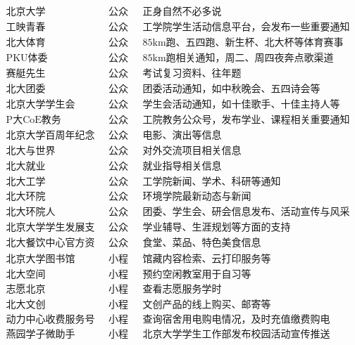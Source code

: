 \documentclass[11pt,oneside]{book}
\begin{document}
\[
\begin{matrix}
	\text{北京大学} & \text{公众号} & \text{正身自然不必多说}\\
	\text{工映青春} & \text{公众号} & \text{工学院学生活动信息平台，会发布一些重要通知}\\
	\text{北大体育} & \text{公众号} & \text{85km跑、五四跑、新生杯、北大杯等体育赛事通知}\\
	\text{PKU体委} & \text{公众号} & \text{85km跑相关通知，周二、周四夜奔点歌渠道}\\
	\text{赛艇先生} & \text{公众号} & \text{考试复习资料、往年题}\\
	\text{北大团委} & \text{公众号} & \text{团委活动通知，如中秋晚会、五四诗会等}\\
	\text{北京大学学生会} & \text{公众号} & \text{学生会活动通知，如十佳歌手、十佳主持人等}\\
	\text{P大CoE教务} & \text{公众号} & \text{工院教务公众号，发布学业、课程相关重要通知}\\
	\text{北京大学百周年纪念讲堂} & \text{公众号} & \text{电影、演出等信息}\\
	\text{北大与世界} & \text{公众号} & \text{对外交流项目相关信息}\\
	\text{北大就业} & \text{公众号} & \text{就业指导相关信息}\\
	\text{北大工学} & \text{公众号} & \text{工学院新闻、学术、科研等通知}\\
	\text{北大环院} & \text{公众号} & \text{环境学院最新动态与新闻}\\
	\text{北大环院人} & \text{公众号} & \text{团委、学生会、研会信息发布、活动宣传与风采展示平台}\\
	\text{北京大学学生发展支持} & \text{公众号} & \text{学业辅导、生涯规划等方面的支持}\\
	\text{北大餐饮中心官方资讯} & \text{公众号} & \text{食堂、菜品、特色美食信息}\\
	\text{北京大学图书馆} & \text{小程序} & \text{馆藏内容检索、云打印服务等}\\
	\text{北大空间} & \text{小程序} & \text{预约空闲教室用于自习等}\\
	\text{志愿北京} & \text{小程序} & \text{查看志愿服务学时}\\
	\text{北大文创} & \text{小程序} & \text{文创产品的线上购买、邮寄等}\\
	\text{动力中心收费服务号} & \text{小程序} & \text{查询宿舍用电购电情况，及时充值缴费购电}\\
	\text{燕园学子微助手} & \text{小程序} & \text{北京大学学生工作部发布校园活动宣传推送}\\
\end{matrix}
\]
\end{document}

